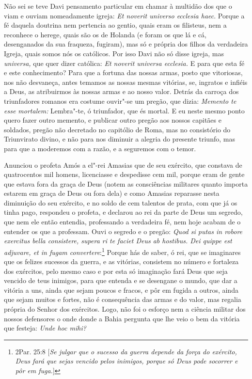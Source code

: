 Não sei se teve Davi pensamento particular em chamar à multidão dos que
o viam e ouviam nomeadamente igreja: \emph{Et noverit universo ecclesia
haec}. Porque a fé daquela doutrina nem pertencia ao gentio, quais eram
os filisteus, nem a reconhece o herege,
quais são os de Holanda (e foram os que lá e cá, desenganados da sua
fraqueza, fugiram), mas só e própria dos filhos da verdadeira Igreja,
quais somos nós os católicos. Por isso Davi não só disse igreja, mas
\emph{universa,} que quer dizer católica: \emph{Et noverit universa
ecclesia.} E para que esta fé e este conhecimento? Para que a fortuna
das nossas armas, posto que vitoriosas, nos não desvaneça, antes temamos
as nossas mesmas vitórias, se, ingratos e infiéis a Deus, as atribuirmos
às nossas armas e ao nosso valor. Detrás da carroça dos triunfadores
romanos era costume ouvir"-se um pregão, que dizia: \emph{Memento te esse
mortalem:} Lembra"-te, ó triunfador, que és mortal. E eu neste mesmo
ponto quero fazer outro memento, e publicar outro pregão aos nossos
capitães e soldados, pregão não decretado no capitólio de Roma, mas no
consistório do Triunvirato divino, e não para nos diminuir a alegria do
presente triunfo, mas para que a moderemos com a razão, e a seguremos
com o temor.

Anunciou o profeta Amós a el"-rei Amasias que de seu exército, que
constava de quatrocentos mil homens, licenciasse e despedisse cem mil,
porque eram de gente que estava fora da graça de Deus (notem as
consciências militares quanto importa estarem em graça de Deus ou fora
dela) e como Amasias reparasse nesta diminuição do seu exército, e no
soldo de cem talentos de prata, com que já os tinha pago, respondeu o
profeta, e declarou ao rei da parte de Deus um segredo, que nem ele
então entendia, professando a verdadeira fé, nem hoje acabam de o
entender os que a professam. Ouvi o segredo e o pregão: \emph{Quod si
putas in robore exercitus bella consistere, supera ri te faciet Deus ab
hostibus. Dei quippe est adjuvare, et in fugam convertere}:\footnote{2Par. 25:8 [\textit{Se julgar que o sucesso da guerra depende da força do exército, Deus fará que sejas vencido pelos inimigos, porque só Deus pode socorrer e pôr em fuga.}]}
Porque hás de saber, ó rei, que se imaginares que os felizes sucessos da
guerra, e as vitórias, consistem no número e fortaleza dos exércitos,
pelo mesmo caso e por esta só imaginação fará Deus que seja vencido de
teus inimigos, para que entenda e se desengane o mundo, que dar a
vitória a uns, ainda que sejam poucos e fracos, e pôr em fugida a
outros, ainda que sejam muitos e fortes, não é consequência das armas e
do valor, mas regalia própria do Senhor dos exércitos. Logo, não foi o
esforço nem a ciência militar dos nossos defensores o onde donde a Bahia
pergunta que lhe veio o bem da vitória que festeja: \emph{Unde hoc
mihi?}

